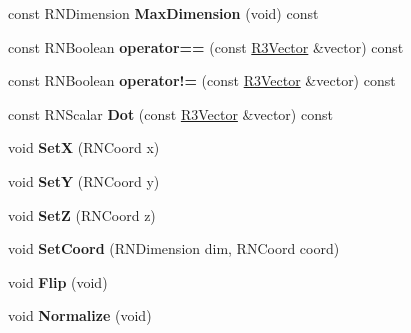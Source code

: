 \begin{DoxyCompactItemize}
\item 
const R\+N\+Dimension {\bfseries Max\+Dimension} (void) const \hypertarget{class_r3_vector_afcd2132f1edd1f206686224b9fee3b0e}{}\label{class_r3_vector_afcd2132f1edd1f206686224b9fee3b0e}

\item 
const R\+N\+Boolean {\bfseries operator==} (const \hyperlink{class_r3_vector}{R3\+Vector} \&vector) const \hypertarget{class_r3_vector_a0195dfd7ed92b0cd9afb8bd2067a45a6}{}\label{class_r3_vector_a0195dfd7ed92b0cd9afb8bd2067a45a6}

\item 
const R\+N\+Boolean {\bfseries operator!=} (const \hyperlink{class_r3_vector}{R3\+Vector} \&vector) const \hypertarget{class_r3_vector_ad8a0915b9073d7bb38159ae3b02f867f}{}\label{class_r3_vector_ad8a0915b9073d7bb38159ae3b02f867f}

\item 
const R\+N\+Scalar {\bfseries Dot} (const \hyperlink{class_r3_vector}{R3\+Vector} \&vector) const \hypertarget{class_r3_vector_a8e342a96e55eeeccaa59eb2faafc67c8}{}\label{class_r3_vector_a8e342a96e55eeeccaa59eb2faafc67c8}

\item 
void {\bfseries SetX} (R\+N\+Coord x)\hypertarget{class_r3_vector_a7467945b4e646ad92179df2e0a2dc110}{}\label{class_r3_vector_a7467945b4e646ad92179df2e0a2dc110}

\item 
void {\bfseries SetY} (R\+N\+Coord y)\hypertarget{class_r3_vector_a45deb784f4bdb661349e42d847873dd0}{}\label{class_r3_vector_a45deb784f4bdb661349e42d847873dd0}

\item 
void {\bfseries SetZ} (R\+N\+Coord z)\hypertarget{class_r3_vector_afb4b9d655c3047919557b4751002c44b}{}\label{class_r3_vector_afb4b9d655c3047919557b4751002c44b}

\item 
void {\bfseries Set\+Coord} (R\+N\+Dimension dim, R\+N\+Coord coord)\hypertarget{class_r3_vector_a85558c2c1181396c67c82e96ab11c32b}{}\label{class_r3_vector_a85558c2c1181396c67c82e96ab11c32b}

\item 
void {\bfseries Flip} (void)\hypertarget{class_r3_vector_ae366894f20d00a32db033d36a1b94573}{}\label{class_r3_vector_ae366894f20d00a32db033d36a1b94573}

\item 
void {\bfseries Normalize} (void)\hypertarget{class_r3_vector_aff4b249fc28ea199efeeb4c7a34f31f7}{}\label{class_r3_vector_aff4b249fc28ea199efeeb4c7a34f31f7}


\end{DoxyCompactItemize}
